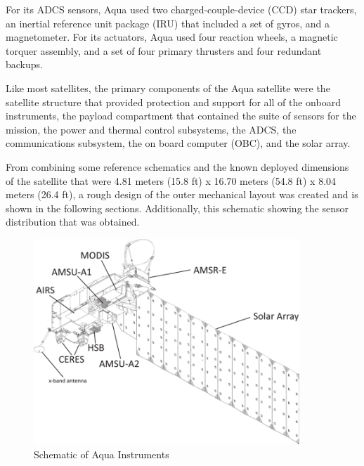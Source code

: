 For its ADCS sensors, Aqua used two charged-couple-device (CCD) star trackers, an inertial reference unit package (IRU) that included a set of gyros, and a magnetometer. For its actuators, Aqua used four reaction wheels, a magnetic torquer assembly, and a set of four primary thrusters and four redundant backups. \cite{aqua_acds}

Like most satellites, the primary components of the Aqua satellite were the satellite structure that provided protection and support for all of the onboard instruments, the payload compartment that contained the suite of sensors for the mission, the power and thermal control subsystems, the ADCS, the communications subsystem, the on board computer (OBC), and the solar array. \cite{aqua_health_summary}

From combining some reference schematics and the known deployed dimensions of the satellite that were 4.81 meters (15.8 ft) x 16.70 meters (54.8 ft) x 8.04 meters (26.4 ft), a rough design of the outer mechanical layout was created and is shown in the following sections. \cite{aqua_mass_sumaries} Additionally, this schematic showing the sensor distribution that was obtained.

\begin{figure}[H]
    \centering
    \includegraphics[width = 10cm]{Images/Schematic-of-the-Aqua-spacecraft-its-six-Earth-observing-instruments-12-panel-solar.png}
    \caption{Schematic of Aqua Instruments}
    \label{fig:squa-schematic}
\end{figure}

